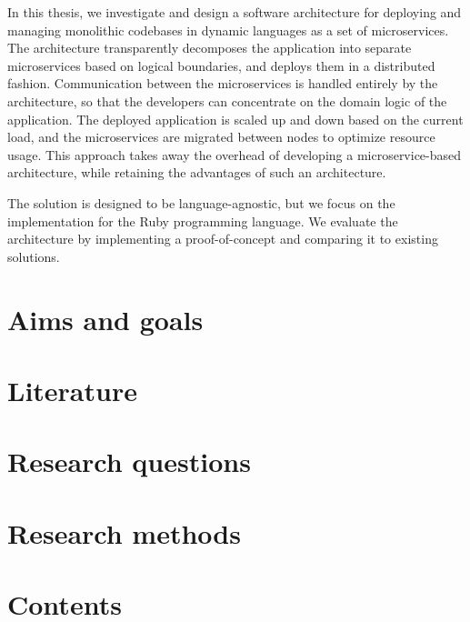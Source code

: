 \documentclass[12pt]{article}
\begin{document}
	In this thesis, we investigate and design a software architecture for deploying and managing monolithic codebases in dynamic languages as a set of microservices.
	The architecture transparently decomposes the application into separate microservices based on logical boundaries, and deploys them in a distributed fashion.
	Communication between the microservices is handled entirely by the architecture, so that the developers can concentrate on the domain logic of the application.
	The deployed application is scaled up and down based on the current load, and the microservices are migrated between nodes to optimize resource usage.
	This approach takes away the overhead of developing a microservice-based architecture, while retaining the advantages of such an architecture.

	The solution is designed to be language-agnostic, but we focus on the implementation for the Ruby programming language.
	We evaluate the architecture by implementing a proof-of-concept and comparing it to existing solutions.

	\clearpage

	\section{Aims and goals}\label{sec:aims-and-goals}

	\clearpage

	\section{Literature}\label{sec:literature}

	\clearpage

	\section{Research questions}\label{sec:research-questions}

	\clearpage

	\section{Research methods}\label{sec:research-methods}

	\clearpage

	\section{Contents}\label{sec:contents}

	\clearpage


	\nocite{*}

	\printbibliography[heading=bibintoc]
\end{document}
